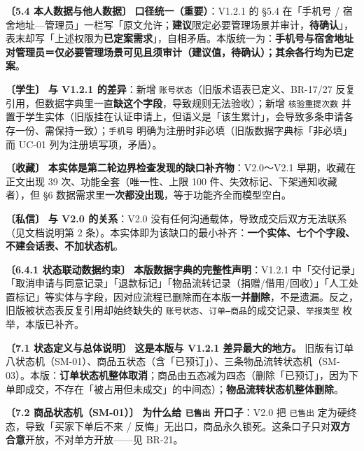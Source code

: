 \documentclass[12pt,a4paper]{ctexart}
\begin{document}
\vspace{0.35em}
{\small\textbf{〔5.4 本人数据与他人数据〕} \textbf{口径统一（重要）}：V1.2.1 的 §5.4 在「手机号 / 宿舍地址—管理员」一栏写「原文允许；\textbf{建议}限定必要管理场景并审计，\textbf{待确认}」，表末却写「上述权限为\textbf{已定案需求}」，自相矛盾。本版统一为：\textbf{手机号与宿舍地址对管理员＝仅必要管理场景可见且须审计（建议值，待确认）；其余各行均为已定案}。}\par
\vspace{0.35em}
{\small\textbf{〔学生〕} \textbf{与 V1.2.1 的差异}：新增 \texttt{账号状态}（旧版术语表已定义、BR-17/27 反复引用，但数据字典里一直\textbf{缺这个字段}，导致规则无法验收）；新增 \texttt{核验重提次数} 并置于学生实体（旧版挂在认证申请上，但语义是「该生累计」，会导致多条申请各存一份、需保持一致）；\texttt{手机号} 明确为注册时非必填（旧版数据字典标「非必填」而 UC-01 列为注册填写项，矛盾）。}\par
\vspace{0.35em}
{\small\textbf{〔收藏〕} \textbf{本实体是第二轮边界检查发现的缺口补齐物}：V2.0～V2.1 早期，收藏在正文出现 39 次、功能全套（唯一性、上限 100 件、失效标记、下架通知收藏者），但 §6 数据需求里\textbf{一次都没出现}，等于功能齐全而模型空白。}\par
\vspace{0.35em}
{\small\textbf{〔私信〕} \textbf{与 V2.0 的关系}：V2.0 没有任何沟通载体，导致成交后双方无法联系（见文档说明第 2 条）。本实体即为该缺口的最小补齐：\textbf{一个实体、七个个字段、不建会话表、不加状态机}。}\par
\vspace{0.35em}
{\small\textbf{〔6.4.1 状态联动数据约束〕} \textbf{本版数据字典的完整性声明}：V1.2.1 中「交付记录」「取消申请与同意记录」「退款标记」「物品流转记录（捐赠/借用/回收）」「人工处置标记」等实体与字段，因对应流程已删除而在本版\textbf{一并删除}，不是遗漏。反之，旧版被状态表反复引用却始终缺失的 \texttt{账号状态}、\texttt{订单—商品}的成交记录、\texttt{举报类型} 枚举，本版已补齐。}\par
\vspace{0.35em}
{\small\textbf{〔7.1 状态定义与总体说明〕} \textbf{这是本版与 V1.2.1 差异最大的地方。} 旧版有订单八状态机（SM-01）、商品五状态（含「已预订」）、三条物品流转状态机（SM-03）。本版：\textbf{订单状态机整体取消}；商品由五态减为四态（删除「已预订」，因为下单即成交，不存在「被占用但未成交」的中间态）；\textbf{物品流转状态机整体删除}。}\par
\vspace{0.35em}
{\small\textbf{〔7.2 商品状态机（SM-01）〕} \textbf{为什么给 \texttt{已售出} 开口子}：V2.0 把 \texttt{已售出} 定为硬终态，导致「买家下单后不来 / 反悔」无出口，商品永久锁死。这条口子只对\textbf{双方合意}开放，不对单方开放——见 BR-21。}\par
\end{document}
